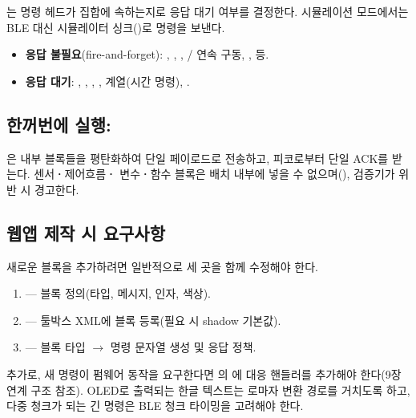 는 명령 헤드가  집합에
속하는지로 응답 대기 여부를 결정한다. 시뮬레이션 모드에서는 BLE 대신
시뮬레이터 싱크()로 명령을 보낸다.

\begin{itemize}
  \item \textbf{응답 불필요}(fire-and-forget): , , ,
        / 연속 구동, ,  등.
  \item \textbf{응답 대기}: , , , ,
         계열(시간 명령), .
\end{itemize}

\subsection{한꺼번에 실행: }

은 내부 블록들을 평탄화하여 
단일 페이로드로 전송하고, 피코로부터 단일 ACK를 받는다. 센서\textbf{·}제어흐름\textbf{·}
변수\textbf{·}함수 블록은 배치 내부에 넣을 수 없으며(),
 검증기가 위반 시 경고한다.

\subsection{웹앱 제작 시 요구사항}

\begin{infobox}[title=새 블록 추가 시 변경 지점]
새로운 블록을 추가하려면 일반적으로 세 곳을 함께 수정해야 한다.
\begin{enumerate}
  \item {} --- 블록 정의(타입, 메시지, 인자, 색상).
  \item {} --- 툴박스 XML에 블록 등록(필요 시 shadow 기본값).
  \item {} --- 블록 타입 $\to$ 명령 문자열 생성 및 응답 정책.
\end{enumerate}
\end{infobox}

추가로, 새 명령이 펌웨어 동작을 요구한다면 의
에 대응 핸들러를 추가해야 한다(9장 연계 구조 참조).
OLED로 출력되는 한글 텍스트는 로마자 변환 경로를 거치도록 하고, 다중 청크가
되는 긴 명령은 BLE 청크 타이밍을 고려해야 한다.

